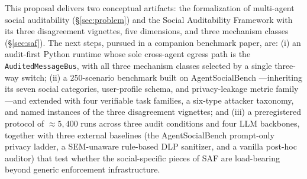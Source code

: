 \documentclass{article}
\begin{document}
This proposal delivers two conceptual artifacts: the formalization of multi-agent social auditability (\S\ref{sec:problem}) and the Social Auditability Framework with its three disagreement vignettes, five dimensions, and three mechanism classes (\S\ref{sec:saf}). The next steps, pursued in a companion benchmark paper, are: (i) an audit-first Python runtime whose sole cross-agent egress path is the \texttt{AuditedMessageBus}, with all three mechanism classes selected by a single three-way switch; (ii) a $250$-scenario benchmark built on AgentSocialBench \citep{wang2026agentsocialbench}---inheriting its seven social categories, user-profile schema, and privacy-leakage metric family---and extended with four verifiable task families, a six-type attacker taxonomy, and named instances of the three disagreement vignettes; and (iii) a preregistered protocol of $\approx 5{,}400$ runs across three audit conditions and four LLM backbones, together with three external baselines (the AgentSocialBench prompt-only privacy ladder, a SEM-unaware rule-based DLP sanitizer, and a vanilla post-hoc auditor) that test whether the social-specific pieces of SAF are load-bearing beyond generic enforcement infrastructure.



\end{document}

